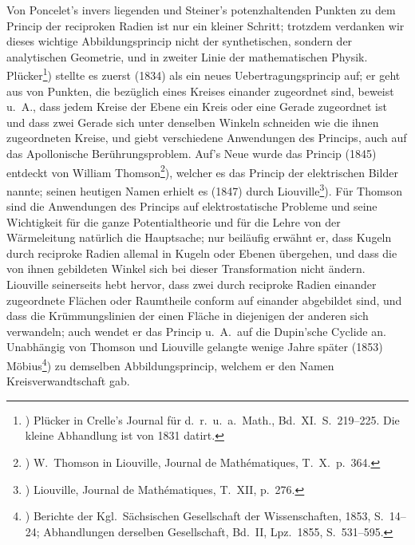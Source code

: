 Von Poncelet's invers liegenden und Steiner's potenzhaltenden
Punkten zu dem Princip der reciproken Radien
ist nur ein kleiner Schritt; trotzdem verdanken wir dieses
wichtige Abbildungsprincip nicht der synthetischen, sondern
der analytischen Geometrie, und in zweiter Linie der mathematischen
Physik. Pl\"ucker\footnote{)
  Pl\"ucker in Crelle's Journal f\"ur d.~r.~u.~a.\ Math., Bd.~XI.\ S.~219--225.
Die kleine Abhandlung ist von 1831 datirt.})
stellte es zuerst (1834) als {\glqq}ein
neues Uebertragungsprincip{\grqq} auf; er geht aus von Punkten,
die bez\"uglich eines Kreises einander zugeordnet sind, beweist
u.~A., dass jedem Kreise der Ebene ein Kreis oder eine Gerade
zugeordnet ist und dass zwei Gerade sich unter denselben
Winkeln schneiden wie die ihnen zugeordneten Kreise,
und giebt verschiedene Anwendungen des Princips, auch auf
das Apollonische Ber\"uhrungsproblem. Auf's Neue wurde das
Princip (1845) entdeckt von William Thomson\footnote{)
  W.~Thomson in Liouville, Journal de Math\'ematiques, T.~X.\ p.~364.}),
welcher es das Princip der elektrischen Bilder nannte; seinen heutigen
Namen erhielt es (1847) durch Liouville\footnote{)
  Liouville, Journal de Math\'ematiques, T.~XII, p.~276. }).
F\"ur Thomson sind die Anwendungen des Princips auf elektrostatische
Probleme und seine Wichtigkeit f\"ur die ganze Potentialtheorie
und f\"ur die Lehre von der W\"armeleitung nat\"urlich die
Hauptsache; nur beil\"aufig erw\"ahnt er, dass Kugeln durch
reciproke Radien allemal in Kugeln oder Ebenen \"ubergehen,
und dass die von ihnen gebildeten Winkel sich bei dieser
Transformation nicht \"andern. Liouville seinerseits hebt hervor,
dass zwei durch reciproke Radien einander zugeordnete
Fl\"achen oder Raumtheile conform auf einander abgebildet
sind, und dass die Kr\"ummungslinien der einen Fl\"ache in
diejenigen der anderen sich verwandeln; auch wendet er das
Princip u.~A.\ auf die Dupin'sche Cyclide an. Unabh\"angig
von Thomson und Liouville gelangte wenige Jahre sp\"ater
(1853) M\"obius\footnote{)
  Berichte der Kgl.\ S\"achsischen Gesellschaft der Wissenschaften,
1853, S.~14--24; Abhandlungen derselben Gesellschaft, Bd.~II,
Lpz.~1855, S.~531--595.})
zu demselben Abbildungsprincip, welchem
er den Namen {\glqq}Kreisverwandtschaft{\grqq} gab.

